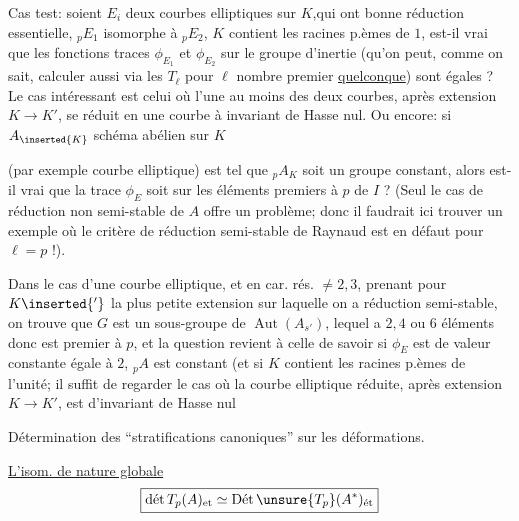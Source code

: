 Cas test: soient $E_i$ deux courbes elliptiques sur $K$,qui ont bonne réduction essentielle, ${}_pE_1$ isomorphe à ${}_pE_2$, $K$ contient les racines p.èmes de $1$, est-il vrai que les fonctions traces $\phi_{E_1}$ et $\phi_{E_2}$ sur le groupe d'inertie (qu'on peut, comme on sait, calculer aussi via les $T_\ell$ pour $\ell$ nombre premier \uline{quelconque}) sont égales ? Le  cas intéressant est celui où l'une au moins des deux courbes, après extension $K\longrightarrow K'$, se réduit en une courbe à invariant de Hasse nul. Ou encore: si $A_{\inserted{K}}$ schéma abélien sur $K$

(par exemple courbe elliptique) est tel que ${}_pA_K$ soit un groupe constant, alors est-il vrai que la trace $\phi_E$ soit  sur les  éléments premiers à $p$ de $I$ ? (Seul le cas de réduction non semi-stable de $A$ offre un problème; donc il faudrait ici trouver un exemple où le critère de réduction semi-stable de Raynaud est en défaut pour $\ell=p$ !).

Dans le cas d'une courbe elliptique, et en car. rés. $\ne 2,3$, prenant pour $K\inserted{'}$ la plus petite extension sur laquelle on a réduction semi-stable, on trouve que $G$ est un sous-groupe de $\operatorname{Aut}(A_{s'})$, lequel  a $2,4$ ou $6$ éléments donc est premier à $p$, et la question revient à celle de savoir si $\phi_E$ est de valeur constante égale à $2$,  ${}_pA$ est constant\deleted{\unsure{,}} (et si $K$ contient les racines p.èmes de l'unité; il suffit de regarder le cas où la courbe elliptique réduite, après extension $K\longrightarrow K'$, est d'invariant de Hasse nul\inserted{)}


Détermination des ``stratifications canoniques'' sur les déformations.

\uline{L'isom. de nature globale}
\[
\boxed{\operatorname{\text{dét}} T_p(A)_{\mathrm{et}}\simeq\operatorname{\text{Dét}}\unsure{T_p}(A^*)_{\text{ét}}}
\]

